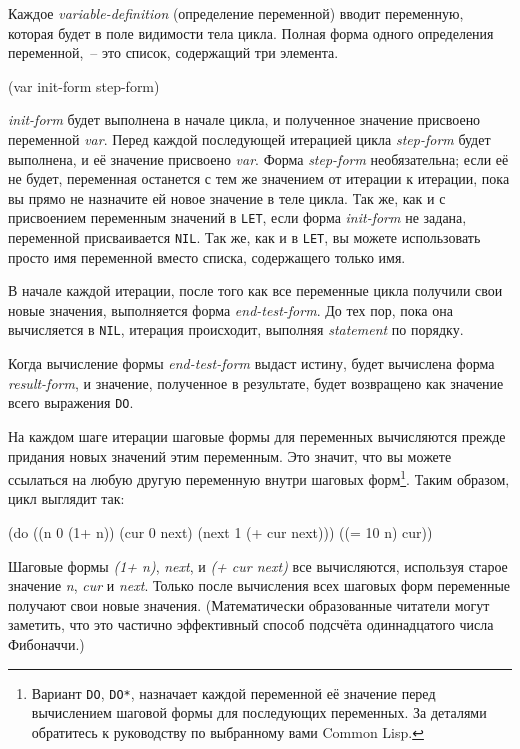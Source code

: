 Каждое \textit{variable-definition} (определение переменной) вводит переменную, которая
будет в поле видимости тела цикла. Полная форма одного определения переменной,~-- это список,
содержащий три элемента.

\begin{myverb}
(var init-form step-form)
\end{myverb}

\noindent{}\textit{init-form} будет выполнена в начале цикла, и полученное значение присвоено
переменной \textit{var}.  Перед каждой последующей итерацией цикла \textit{step-form}
будет выполнена, и её значение присвоено \textit{var}.  Форма \textit{step-form}
необязательна; если её не будет, переменная останется с тем же значением от итерации к
итерации, пока вы прямо не назначите ей новое значение в теле цикла. Так же, как и с
присвоением переменным значений в \lstinline{LET}, если форма \textit{init-form} не задана,
переменной присваивается \lstinline{NIL}. Так же, как и в \lstinline{LET}, вы можете использовать
просто имя переменной вместо списка, содержащего только имя.

В начале каждой итерации, после того как все переменные цикла получили свои новые
значения, выполняется форма \textit{end-test-form}. До тех пор, пока она вычисляется в
\lstinline{NIL}, итерация происходит, выполняя \textit{statement} по порядку.

Когда вычисление формы \textit{end-test-form} выдаст истину, будет вычислена форма
\textit{result-form}, и значение, полученное в результате, будет возвращено как значение
всего выражения \lstinline{DO}.

На каждом шаге итерации шаговые формы для переменных вычисляются прежде придания новых
значений этим переменным. Это значит, что вы можете ссылаться на любую другую переменную
внутри шаговых форм\footnote{Вариант \lstinline{DO}, \lstinline{DO*}, назначает каждой переменной
  её значение перед вычислением шаговой формы для последующих переменных. За деталями
  обратитесь к руководству по выбранному вами Common Lisp.}. Таким образом, цикл выглядит
так:

\begin{myverb}
(do ((n 0 (1+ n))
     (cur 0 next)
     (next 1 (+ cur next)))
    ((= 10 n) cur))
\end{myverb}

Шаговые формы \textit{(1+ n)}, \textit{next}, и \textit{(+ cur next)} все вычисляются,
используя старое значение \textit{n}, \textit{cur} и \textit{next}. Только после
вычисления всех шаговых форм переменные получают свои новые значения. (Математически
образованные читатели могут заметить, что это частично эффективный способ подсчёта
одиннадцатого числа Фибоначчи.)

